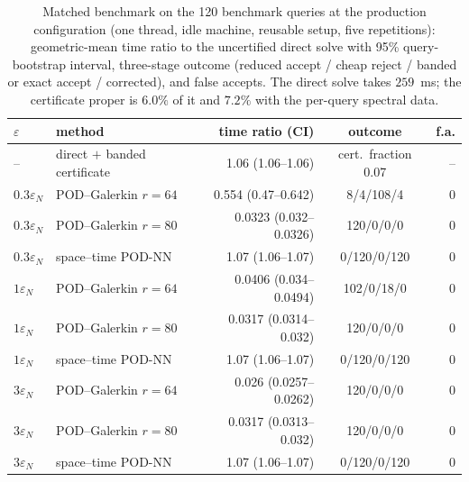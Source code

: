 \begin{table}[!htbp]
\centering\small
\caption{Matched benchmark on the 120 benchmark queries at the production configuration (one thread, idle machine, reusable setup, five repetitions): geometric-mean time ratio to the uncertified direct solve with 95\% query-bootstrap interval, three-stage outcome (reduced accept / cheap reject / banded or exact accept / corrected), and false accepts.  The direct solve takes $259$~ms; the certificate proper is $6.0\%$ of it and $7.2\%$ with the per-query spectral data.}
\label{tab:benchmark}
\begin{tabular}{llrcr}
\toprule
$\varepsilon$ & method & time ratio (CI) & outcome & f.a.\\
\midrule
-- & direct $+$ banded certificate & 1.06 (1.06--1.06) & cert.\ fraction 0.07 & --\\
$0.3\varepsilon_N$ & POD--Galerkin $r=64$ & 0.554 (0.47--0.642) & 8/4/108/4 & 0\\
$0.3\varepsilon_N$ & POD--Galerkin $r=80$ & 0.0323 (0.032--0.0326) & 120/0/0/0 & 0\\
$0.3\varepsilon_N$ & space--time POD-NN & 1.07 (1.06--1.07) & 0/120/0/120 & 0\\
$1\varepsilon_N$ & POD--Galerkin $r=64$ & 0.0406 (0.034--0.0494) & 102/0/18/0 & 0\\
$1\varepsilon_N$ & POD--Galerkin $r=80$ & 0.0317 (0.0314--0.032) & 120/0/0/0 & 0\\
$1\varepsilon_N$ & space--time POD-NN & 1.07 (1.06--1.07) & 0/120/0/120 & 0\\
$3\varepsilon_N$ & POD--Galerkin $r=64$ & 0.026 (0.0257--0.0262) & 120/0/0/0 & 0\\
$3\varepsilon_N$ & POD--Galerkin $r=80$ & 0.0317 (0.0313--0.032) & 120/0/0/0 & 0\\
$3\varepsilon_N$ & space--time POD-NN & 1.07 (1.06--1.07) & 0/120/0/120 & 0\\
\bottomrule
\end{tabular}
\end{table}
